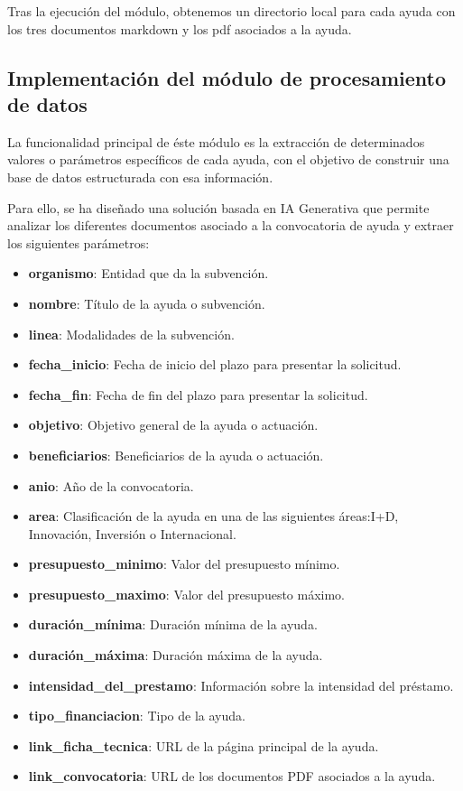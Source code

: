 Tras la ejecución del módulo, obtenemos un directorio local para cada ayuda con los tres documentos markdown y los pdf asociados a la ayuda.


\subsection{Implementación del módulo de procesamiento de datos}

La funcionalidad principal de éste módulo es la extracción de determinados valores o parámetros específicos de cada ayuda, con el objetivo de construir una base de datos estructurada con esa información.

Para ello, se ha diseñado una solución basada en IA Generativa que permite analizar los diferentes documentos asociado a la convocatoria de ayuda y extraer los siguientes parámetros:

\begin{itemize}
    \item \textbf{organismo}: Entidad que da la subvención.
    \item \textbf{nombre}: Título de la ayuda o subvención. 
    \item \textbf{linea}: Modalidades de la subvención.
    \item \textbf{fecha\_inicio}: Fecha de inicio del plazo para presentar la solicitud.
    \item \textbf{fecha\_fin}: Fecha de fin del plazo para presentar la solicitud.
    \item \textbf{objetivo}: Objetivo general de la ayuda o actuación.
    \item \textbf{beneficiarios}: Beneficiarios de la ayuda o actuación.
    \item \textbf{anio}: Año de la convocatoria.
    \item \textbf{area}: Clasificación de la ayuda en una de las siguientes áreas:I+D, Innovación, Inversión o Internacional.
    \item \textbf{presupuesto\_minimo}: Valor del presupuesto mínimo.
    \item \textbf{presupuesto\_maximo}: Valor del presupuesto máximo.
    \item \textbf{duración\_mínima}: Duración mínima de la ayuda.
    \item \textbf{duración\_máxima}: Duración máxima de la ayuda.
    \item \textbf{intensidad\_del\_prestamo}: Información sobre la intensidad del préstamo.
    \item \textbf{tipo\_financiacion}: Tipo de la ayuda.
    \item \textbf{link\_ficha\_tecnica}: URL de la página principal de la ayuda.
    \item \textbf{link\_convocatoria}: URL de los documentos PDF asociados a la ayuda.
\end{itemize}

